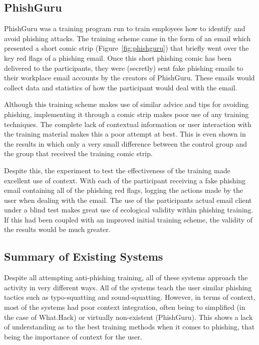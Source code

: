 \documentclass{l4proj}
\begin{document}
\subsection{PhishGuru}
PhishGuru \citep{kumaraguru2008lessons} was a training program run to train employees how to identify and avoid phishing attacks. The training scheme came in the form of an email which presented a short comic strip (Figure~\ref{fig:phishguru}) that briefly went over the key red flags of a phishing email. Once this short phishing comic has been delivered to the participants, they were (secretly) sent fake phishing emails to their workplace email accounts by the creators of PhishGuru. These emails would collect data and statistics of how the participant would deal with the email. 

Although this training scheme makes use of similar advice and tips for avoiding phishing, implementing it through a comic strip makes poor use of any training techniques. The complete lack of contextual information or user interaction with the training material makes this a poor attempt at best. This is even shown in the results in which only a very small difference between the control group and the group that received the training comic strip.

Despite this, the experiment to test the effectiveness of the training made excellent use of context. With each of the participant receiving a fake phishing email containing all of the phishing red flags, logging the actions made by the user when dealing with the email. The use of the participants actual email client under a blind test makes great use of ecological validity within phishing training. If this had been coupled with an improved initial training scheme, the validity of the results would be much greater.

\subsection{Summary of Existing Systems}
Despite all attempting anti-phishing training, all of these systems approach the activity in very different ways. All of the systems teach the user similar phishing tactics such as typo-squatting and sound-squatting. However, in terms of context, most of the systems had poor context integration, often being to simplified (in the case of What.Hack) or virtually non-existent (PhishGuru). This shows a lack of understanding as to the best training methods when it comes to phishing, that being the importance of context for the user. 
\end{document}
